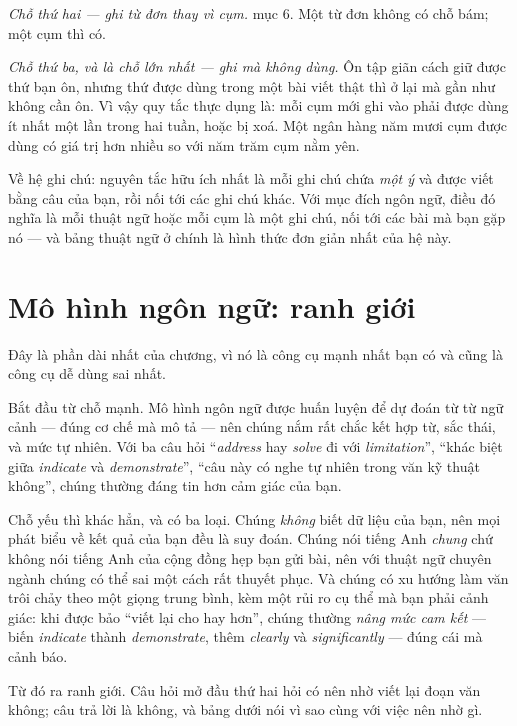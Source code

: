 \documentclass[../../english.tex]{subfiles}
\begin{document}
\emph{Chỗ thứ hai --- ghi từ đơn thay vì cụm.}  mục 6. Một từ đơn không có chỗ bám; một cụm thì có.

\emph{Chỗ thứ ba, và là chỗ lớn nhất --- ghi mà không dùng.} Ôn tập giãn cách giữ được thứ bạn ôn, nhưng thứ được dùng trong một bài viết thật thì ở lại mà gần như không cần ôn. Vì vậy quy tắc thực dụng là: mỗi cụm mới ghi vào phải được dùng ít nhất một lần trong hai tuần, hoặc bị xoá. Một ngân hàng năm mươi cụm được dùng có giá trị hơn nhiều so với năm trăm cụm nằm yên.

Về hệ ghi chú: nguyên tắc hữu ích nhất là mỗi ghi chú chứa \emph{một ý} và được viết bằng câu của bạn, rồi nối tới các ghi chú khác\cite{ahrens2017}. Với mục đích ngôn ngữ, điều đó nghĩa là mỗi thuật ngữ hoặc mỗi cụm là một ghi chú, nối tới các bài mà bạn gặp nó --- và bảng thuật ngữ ở  chính là hình thức đơn giản nhất của hệ này.

\section{Mô hình ngôn ngữ: ranh giới}

Đây là phần dài nhất của chương, vì nó là công cụ mạnh nhất bạn có và cũng là công cụ dễ dùng sai nhất.

Bắt đầu từ chỗ mạnh. Mô hình ngôn ngữ được huấn luyện để dự đoán từ từ ngữ cảnh --- đúng cơ chế mà  mô tả --- nên chúng nắm rất chắc kết hợp từ, sắc thái, và mức tự nhiên. Với ba câu hỏi ``\emph{address} hay \emph{solve} đi với \emph{limitation}'', ``khác biệt giữa \emph{indicate} và \emph{demonstrate}'', ``câu này có nghe tự nhiên trong văn kỹ thuật không'', chúng thường đáng tin hơn cảm giác của bạn.

Chỗ yếu thì khác hẳn, và có ba loại. Chúng \emph{không} biết dữ liệu của bạn, nên mọi phát biểu về kết quả của bạn đều là suy đoán. Chúng nói tiếng Anh \emph{chung} chứ không nói tiếng Anh của cộng đồng hẹp bạn gửi bài, nên với thuật ngữ chuyên ngành chúng có thể sai một cách rất thuyết phục. Và chúng có xu hướng làm văn trôi chảy theo một giọng trung bình, kèm một rủi ro cụ thể mà bạn phải cảnh giác: khi được bảo ``viết lại cho hay hơn'', chúng thường \emph{nâng mức cam kết} --- biến \emph{indicate} thành \emph{demonstrate}, thêm \emph{clearly} và \emph{significantly} --- đúng cái mà  cảnh báo.

Từ đó ra ranh giới. Câu hỏi mở đầu thứ hai hỏi có nên nhờ viết lại đoạn văn không; câu trả lời là không, và bảng dưới nói vì sao cùng với việc nên nhờ gì.
\end{document}

